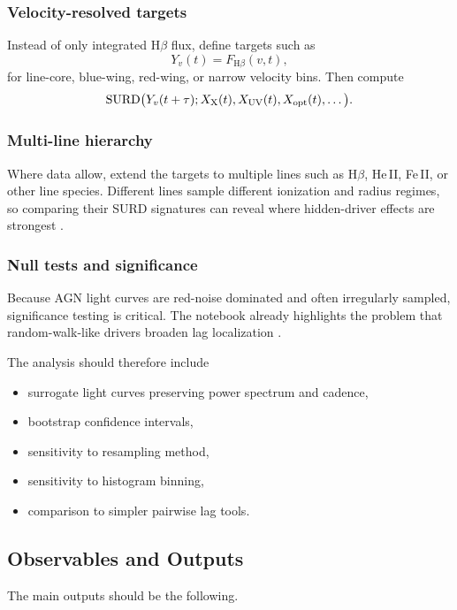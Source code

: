 \documentclass{article}
\begin{document}
\subsubsection{Velocity-resolved targets}

Instead of only integrated H$\beta$ flux, define targets such as
\[
Y_v(t) = F_{\mathrm{H}\beta}(v,t),
\]
for line-core, blue-wing, red-wing, or narrow velocity bins. Then compute
\[
\mathrm{SURD}\big(Y_v(t+\tau);X_{\rm X}(t),X_{\rm UV}(t),X_{\rm opt}(t),\dots\big).
\]

\subsubsection{Multi-line hierarchy}

Where data allow, extend the targets to multiple lines such as H$\beta$, He\,II, Fe\,II, or other line species. Different lines sample different ionization and radius regimes, so comparing their SURD signatures can reveal where hidden-driver effects are strongest \cite{CackettHorneWinkler2021,FengEtAl2024}.

\subsubsection{Null tests and significance}

Because AGN light curves are red-noise dominated and often irregularly sampled, significance testing is critical. The notebook already highlights the problem that random-walk-like drivers broaden lag localization \cite{AGN_SURD_notebook}.

The analysis should therefore include
\begin{itemize}
    \item surrogate light curves preserving power spectrum and cadence,
    \item bootstrap confidence intervals,
    \item sensitivity to resampling method,
    \item sensitivity to histogram binning,
    \item comparison to simpler pairwise lag tools.
\end{itemize}

\subsection{Observables and Outputs}

The main outputs should be the following.
\end{document}
